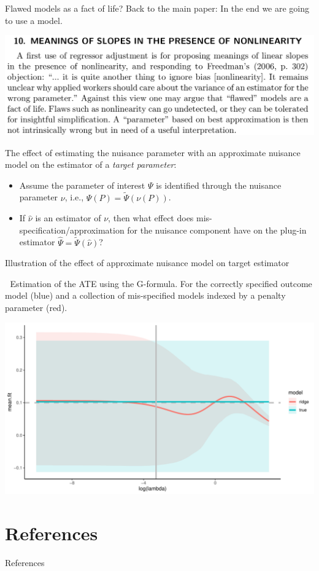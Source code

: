 \documentclass[smaller]{beamer}\usepackage{listings}
\begin{document}
\begin{frame}[label={sec:org787418e}]{Flawed models as a fact of life?}
Back to the main paper: In the end we are going to use a model.
\begin{center}
\includegraphics[width=.9\linewidth]{./quotes/sect10-model-approx.png}
\end{center}

The effect of estimating the nuisance parameter with an approximate nuisance model on the estimator
of a \emph{target parameter}:
\begin{itemize}
\item Assume the parameter of interest \(\Psi\) is identified through the nuisance parameter \(\nu\), i.e.,
\(\Psi(P) = \tilde\Psi(\nu(P))\).
\item If \(\hat \nu\) is an estimator of \(\nu\), then what effect does mis-specification/approximation for
the nuisance component have on the plug-in estimator \(\hat \Psi = \tilde\Psi(\hat \nu)\)?
\end{itemize}
\end{frame}

\begin{frame}[label={sec:org7c684e6}]{\normalsize Illustration of the effect of approximate nuisance model on target estimator}
\begin{block}{$\;$}
\small Estimation of the ATE using the G-formula. For the correctly specified outcome model (blue)
and a collection of mis-specified models indexed by a penalty parameter (red).

\begin{center}
\includegraphics[width=.9\linewidth]{./fig-approximate-nuisance.pdf}
\end{center}
\end{block}
\end{frame}

\section{References}
\label{sec:org6e6a4d7}

\begin{frame}[label={sec:orgfb9e53b}]{References}
\small 
\end{frame}
\end{document}
